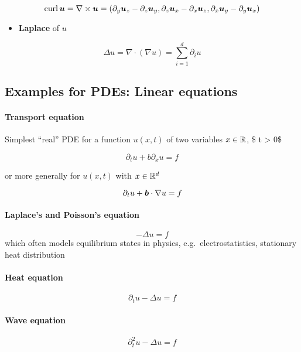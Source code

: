 \documentclass[11pt]{article}
\providecommand{\tightlist}{%
      \setlength{\itemsep}{0pt}\setlength{\parskip}{0pt}}
\begin{document}
\[
\operatorname{curl} \boldsymbol u = \nabla \times \boldsymbol u =
\left(
\partial_y \boldsymbol u_z - \partial_z \boldsymbol u_y,
\partial_z \boldsymbol u_x - \partial_x \boldsymbol u_z,
\partial_x \boldsymbol u_y - \partial_y \boldsymbol u_x
\right)
\]

\begin{itemize}
\tightlist
\item
  {\bf Laplace} of \(u\)
\end{itemize}

\[
\Delta u =  \nabla \cdot (\nabla u) = \sum_{i=1}^d \partial_i u
\]

    \subsection{Examples for PDEs: Linear
equations}\label{examples-for-pdes-linear-equations}

\paragraph{Transport equation}\label{transport-equation}

Simplest ``real'' PDE for a function \(u(x,t)\) of two variables
\(x\in \mathbb{R}\), \$ t \textgreater{} 0\$

\[
\partial_t u + b \partial_x u = f
\]

or more generally for \(u(x,t)\) with \(x \in \mathbb{R}^d\)

\[
\partial_t u + \boldsymbol b \cdot \nabla u = f
\]

    \paragraph{Laplace's and Poisson's
equation}\label{laplaces-and-poissons-equation}

\[
 - \Delta u =  f
\] which often models equilibrium states in physics,
e.g.~electrostatistics, stationary heat distribution

    \paragraph{Heat equation}\label{heat-equation}

\[
\partial_tu - \Delta u = f
\]

    \paragraph{Wave equation}\label{wave-equation}

\[
\partial_t^2 u - \Delta u = f
\]
\end{document}
